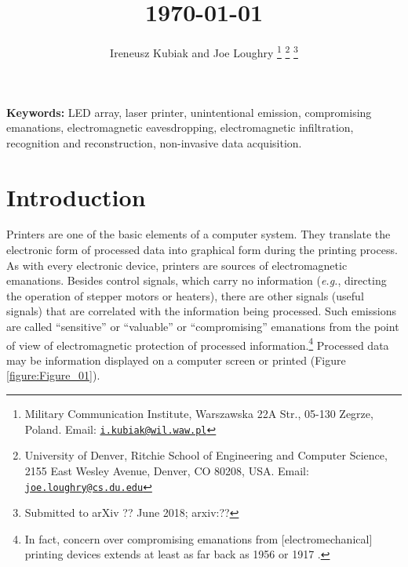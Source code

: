 \documentclass[letterpaper,journal]{ieeetran}
\begin{document}
\title{ \\
\vspace*{20pt}\normalsize\today}

\author{Ireneusz Kubiak
    and Joe Loughry %
\thanks{Military Communication Institute,
Warszawska 22A Str., 05-130 Zegrze, Poland. Email:
\href{mailto:i.kubiak@wil.waw.pl}{\nolinkurl{i.kubiak@wil.waw.pl}}}
\thanks{University of Denver, Ritchie School of
Engineering and Computer Science, 2155 East Wesley Avenue, Denver, CO 80208,
USA. Email:
\href{mailto:joe.loughry@cs.du.edu}{\nolinkurl{joe.loughry@cs.du.edu}}}
\thanks{Submitted to arXiv ?? June 2018; arxiv:??}}

\maketitle


\begin{abstract}
	
\end{abstract}

\textbf{Keywords:} LED array, laser printer, unintentional emission,
compromising emanations, electromagnetic eavesdropping, electromagnetic
infiltration, recognition and reconstruction, non-invasive data acquisition.

\IEEEpeerreviewmaketitle

\section{Introduction}

Printers are one of the basic elements of a computer system. They translate
the electronic form of processed data into graphical form during the printing
process. As with every electronic device, printers are sources of
electromagnetic emanations. Besides control signals, which carry no
information ({\it e.g.}, directing the operation of stepper motors or
heaters), there are other signals (useful signals) that are correlated with
the information being processed. Such emissions are called ``sensitive'' or
``valuable'' or ``compromising'' emanations from the point of view of
electromagnetic protection of processed information.\footnote{In fact,
concern over compromising emanations from [electromechanical] printing
devices extends at least as far back as 1956 \cite[[pp.~83--4,
109--111]{Wright1987} or 1917 \cite[Chapter 13]{Kahn1996}.} Processed data may
be information displayed on a computer screen or printed (Figure
\ref{figure:Figure_01}).
\end{document}
